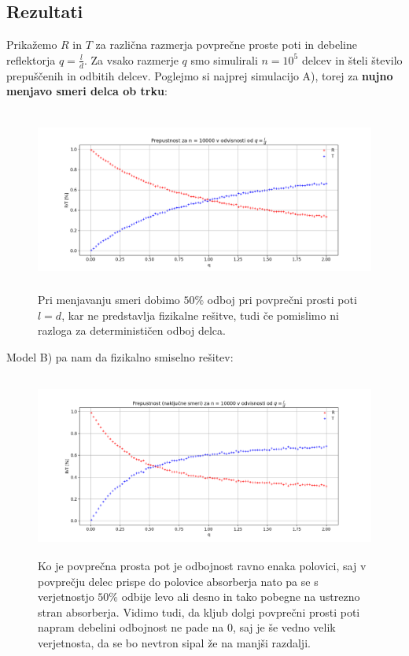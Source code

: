 \documentclass[11pt, a4paper]{article}
\begin{document}
\subsection{Rezultati}
Prikažemo $R $ in $T$ za različna razmerja povprečne proste poti in debeline reflektorja $q =\frac{l}{d}$. \newline\newline 
Za vsako razmerje $q$ smo simulirali $n = 10^5$ delcev in šteli število prepuščenih in odbitih delcev. Poglejmo si najprej simulacijo A), torej za \textbf{nujno menjavo smeri delca ob trku}:
\begin{figure}[H]
\hspace*{-2.5cm}  
  \includegraphics[width=22cm, height = 6cm]{tretja_2.png}
 \caption{Pri menjavanju smeri dobimo $50 \%$ odboj pri povprečni prosti poti $l = d $, kar ne predstavlja fizikalne rešitve, tudi če pomislimo ni razloga za determinističen odboj delca.}
\end{figure}
Model B) pa nam da fizikalno smiselno rešitev:
\begin{figure}[H]
\hspace*{-2.5cm}  
  \includegraphics[width=22cm, height = 6cm]{tretja_1.png}
 \caption{Ko je povprečna prosta pot je odbojnost ravno enaka polovici, saj v povprečju delec prispe do polovice absorberja nato pa se s verjetnostjo $50 \%$ odbije levo ali desno in tako pobegne na ustrezno stran absorberja.\newline\newline
 Vidimo tudi, da kljub dolgi povprečni prosti poti napram debelini odbojnost ne pade na 0, saj je še vedno velik verjetnosta, da se bo nevtron sipal že na manjši razdalji.  }
\end{figure}
\end{document}
